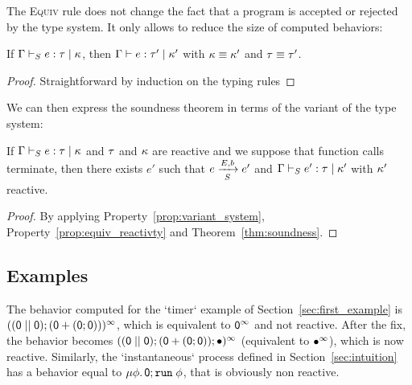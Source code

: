 \documentclass[9pt,preprint]{sigplanconf}
\begin{document}
The \textsc{Equiv} rule does not change the fact that a program is accepted or rejected by the type system. It only allows to reduce the size of computed behaviors:
\begin{property}
\label{prop:variant_system}
If $\tyjus{\tyenv}{e}{\rt}{\rk}$, then $\tyju{\tyenv}{e}{\rt'}{\rk'}$ with $\effeq{\rk}{\rk'}$ and $\tyeq{\rt}{\rt'}$.
\end{property}
\begin{proof}
Straightforward by induction on the typing rules
\end{proof}

We can then express the soundness theorem in terms of the variant of the type system:
\begin{theorem}
If \mbox{$\tyjus{\tyenv}{e}{\rt}{\rk}$} and $\rt$ and $\rk$ are reactive and we suppose that function calls terminate, then there exists $e'$ such that \mbox{$\bigstep{N}{e}{e'} {E}{b}{S}$} and \mbox{$\tyjus{\tyenv}{e'}{\rt}{\rk'}$} with $\rk'$ reactive.
\end{theorem}
\begin{proof}
By applying Property~\ref{prop:variant_system}, Property~\ref{prop:equiv_reactivty} and Theorem~\ref{thm:soundness}.
\end{proof}

\subsection{Examples}

The behavior computed for the `timer` example of Section~\ref{sec:first_example} is \mbox{$\effinf{(\effcon{(\effpar{\effmin}{\effmin})}{(\effor{\effmin}{(\effcon{\effmin}{\effmin})})})}$}, which is equivalent to $\effinf{\effmin}$ and not reactive. After the fix, the behavior becomes \mbox{$\effinf{(\effcon{(\effpar{\effmin}{\effmin})}{\effcon{(\effor{\effmin}{(\effcon{\effmin}{\effmin})})}{\effplus}})}$} (equivalent to $\effinf{\effplus}$), which is now reactive. Similarly, the `instantaneous` process defined in Section~\ref{sec:intuition} has a behavior equal to $\effrec{\effvar}{\effcon{\effmin}{\effrun{\effvar}}}$, that is obviously non reactive.
\end{document}
